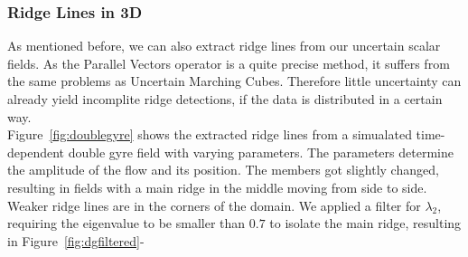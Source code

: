 \subsubsection{Ridge Lines in 3D}\label{sec:evalRL3D}

As mentioned before, we can also extract ridge lines from our uncertain
scalar fields. As the Parallel Vectors operator is a quite precise
method, it suffers from the same problems as Uncertain Marching Cubes.
Therefore little uncertainty can already yield incomplite ridge
detections, if the data is distributed in a certain way.\\
\indent Figure~\ref{fig:doublegyre} shows the extracted ridge lines from
a simualated time-dependent double gyre field with varying parameters.
The parameters determine the amplitude of the flow and its position. The
members got slightly changed, resulting in fields with a main ridge in
the middle moving from side to side. Weaker ridge lines are in the
corners of the domain. We applied a filter for $\lambda_2$, requiring
the eigenvalue to be smaller than $0.7$ to isolate the main ridge, 
resulting in Figure~\ref{fig:dgfiltered}-

